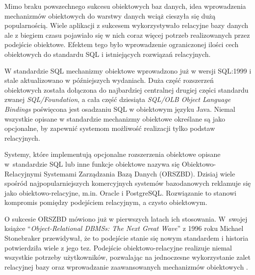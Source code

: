 \documentclass[a4paper,twoside,12pt]{book}
\begin{document}
Mimo braku powszechnego sukcesu obiektowych baz danych, idea wprowadzenia mechanizmów obiektowych do warstwy danych wciąż cieszyła się dużą popularnością. Wiele aplikacji z sukcesem wykorzystywało relacyjne bazy danych ale z biegiem czasu pojawiało się w nich coraz więcej potrzeb realizowanych przez podejście obiektowe. Efektem tego było wprowadzenie ograniczonej ilości cech obiektowych do standardu SQL i istniejących rozwiązań relacyjnych.

W standardzie SQL mechanizmy obiektowe wprowadzono już w wersji SQL:1999 i stale aktualizowano w późniejszych wydaniach. Duża część rozszerzeń obiektowych została dołączona do najbardziej centralnej drugiej części standardu zwanej \textit{SQL/Foundation}, a cała część dziesiąta \textit{SQL/OLB Object Language Bindings} poświęcona jest osadzaniu SQL w obiektowym języku Java. Niemal wszystkie opisane w standardzie mechanizmy obiektowe określane są jako opcjonalne, by zapewnić systemom możliwość realizacji tylko podstaw relacyjnych.

Systemy, które implementują opcjonalne rozszerzenia obiektowe opisane w~standardzie SQL lub inne funkcje obiektowe nazywa się Obiektowo{-}Relacyjnymi Systemami Zarządzania Bazą Danych (ORSZBD). Dzisiaj wiele spośród najpopularniejszych komercyjnych systemów bazodanowych reklamuje się jako obiektowo-relacyjne, m.in. Oracle i PostgreSQL. Rozwiązanie to stanowi kompromis pomiędzy podejściem relacyjnym, a czysto obiektowym.

O sukcesie ORSZBD mówiono już w pierwszych latach ich stosowania. W~swojej książce ``\textit{Object-Relational DBMSs: The Next Great Wave}'' z 1996 roku Michael Stonebraker przewidywał, że to podejście stanie się nowym standardem i historia potwierdziła wiele z jego tez. Podejście obiektowo-relacyjne realizuje niemal wszystkie potrzeby użytkowników, pozwalając na jednoczesne wykorzystanie zalet relacyjnej bazy oraz wprowadzanie zaawansowanych mechanizmów obiektowych \cite{bib:ordbms-tracking-the-next-great-wave,bib:ordbms-the-next-great-wave}.
\end{document}
